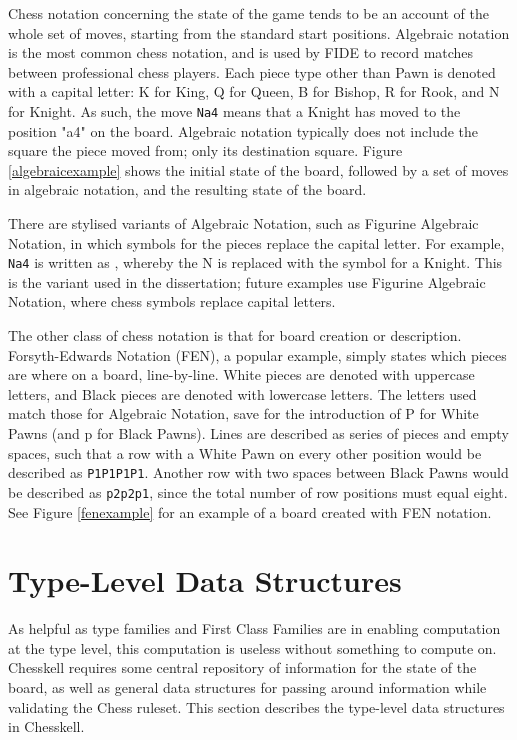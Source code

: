 \documentclass[12pt, a4paper, bibliography=totocnumbered]{scrreprt}
\begin{document}
Chess notation concerning the state of the game tends to be an account of the whole set of moves, starting from the standard start positions. Algebraic notation is the most common chess notation, and is used by FIDE to record matches between professional chess players. Each piece type other than Pawn is denoted with a capital letter: K for King, Q for Queen, B for Bishop, R for Rook, and N for Knight. As such, the move \texttt{Na4} means that a Knight has moved to the position "a4" on the board. Algebraic notation typically does not include the square the piece moved from; only its destination square. Figure \ref{algebraicexample} shows the initial state of the board, followed by a set of moves in algebraic notation, and the resulting state of the board.

There are stylised variants of Algebraic Notation, such as Figurine Algebraic Notation, in which symbols for the pieces replace the capital letter. For example, \texttt{Na4} is written as , whereby the N is replaced with the symbol for a Knight. This is the variant used in the dissertation; future examples use Figurine Algebraic Notation, where chess symbols replace capital letters.

The other class of chess notation is that for board creation or description. Forsyth-Edwards Notation (FEN), a popular example, simply states which pieces are where on a board, line-by-line. White pieces are denoted with uppercase letters, and Black pieces are denoted with lowercase letters. The letters used match those for Algebraic Notation, save for the introduction of P for White Pawns (and p for Black Pawns). Lines are described as series of pieces and empty spaces, such that a row with a White Pawn on every other position would be described as \texttt{P1P1P1P1}. Another row with two spaces between Black Pawns would be described as \texttt{p2p2p1}, since the total number of row positions must equal eight. See Figure \ref{fenexample} for an example of a board created with FEN notation.

\section{Type-Level Data Structures}

As helpful as type families and First Class Families are in enabling computation at the type level, this computation is useless without something to compute on. Chesskell requires some central repository of information for the state of the board, as well as general data structures for passing around information while validating the Chess ruleset. This section describes the type-level data structures in Chesskell.
\end{document}
